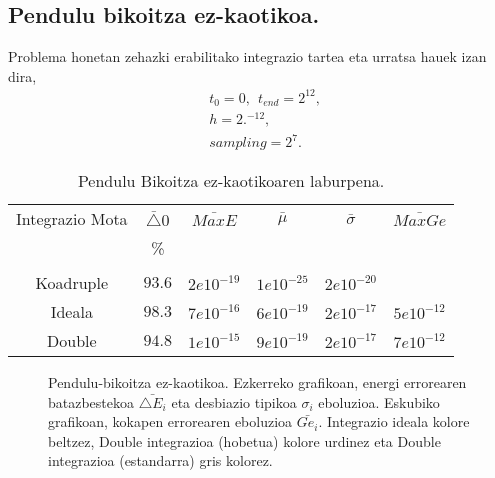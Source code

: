 \subsection{Pendulu bikoitza ez-kaotikoa.}

Problema honetan zehazki erabilitako integrazio tartea eta urratsa hauek izan dira,
\begin{align*}
& t_0=0, \ \ t_{end}=2^{12}, \\
& h=2.^{-12}, \\
& sampling=2^7. 
\end{align*} 


\begin{table} [H]
\caption{Pendulu Bikoitza ez-kaotikoaren laburpena.}
\label{tab:2}       %
\begin{tabular}{c|c c c c c} 
 Integrazio Mota   &  $\bar{\triangle}0$  &  $\bar{MaxE}$ & $\bar{\mu}$  & $\bar{\sigma}$   & $\bar{MaxGe}$  \\
                           &   \%            &       &          &            &         \\
 \hline
                           &                 &         &       &           &          \\
 Koadruple                 &   $93.6$        &  $2e10^{-19}$  & $1e10^{-25}$  & $2e10^{-20}$  &      \\	    
 Ideala                    &   $98.3$        &  $7e10^{-16}$  & $6e10^{-19}$  & $2e10^{-17}$ &  $5e10^{-12}$\\
 Double                    &   $94.8$        &  $1e10^{-15}$  & $9e10^{-19}$  & $2e10^{-17}$ &  $7e10^{-12}$\\
\end{tabular}
\end{table}

\begin{figure}[!h]
\centering
{}
\caption[Pendulu-bikoitza: energi errorearen  eta kokapen errorearen eboluzioa.]
        {\small Pendulu-bikoitza ez-kaotikoa. Ezkerreko grafikoan,  energi errorearen batazbestekoa $\bar{\triangle E_i}$ eta desbiazio tipikoa $\sigma_i$ eboluzioa. Eskubiko grafikoan, kokapen errorearen eboluzioa $\bar{Ge_i}$. Integrazio ideala kolore beltzez, Double integrazioa (hobetua) kolore urdinez eta Double integrazioa (estandarra) gris kolorez.}
\label{fig:plot3}
\end{figure}        

